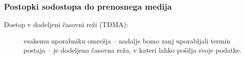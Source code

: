 \documentclass{beamer}
\begin{document}
\begin{frame}
    \frametitle{Postopki sodostopa do prenosnega medija}
    \begin{description}
\item[Dostop v dodeljeni časovni reži (TDMA):]
    vsakemu uporabniku omrežja -- nadalje bomo zanj uporabljali termin \alert{postaja} -- je dodeljena časovna reža, v kateri lahko pošilja svoje podatke.
    \end{description}
\end{frame}
\end{document}
